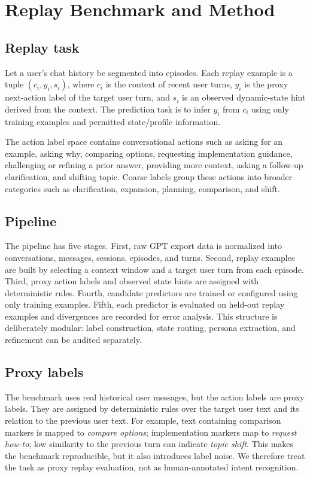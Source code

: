 \section{Replay Benchmark and Method}
\label{sec:method}

\subsection{Replay task}

Let a user's chat history be segmented into episodes. Each replay example is a tuple $(c_i, y_i, s_i)$, where $c_i$ is the context of recent user turns, $y_i$ is the proxy next-action label of the target user turn, and $s_i$ is an observed dynamic-state hint derived from the context. The prediction task is to infer $y_i$ from $c_i$ using only training examples and permitted state/profile information.

The action label space contains conversational actions such as asking for an example, asking why, comparing options, requesting implementation guidance, challenging or refining a prior answer, providing more context, asking a follow-up clarification, and shifting topic. Coarse labels group these actions into broader categories such as clarification, expansion, planning, comparison, and shift.

\subsection{Pipeline}

The pipeline has five stages. First, raw GPT export data is normalized into conversations, messages, sessions, episodes, and turns. Second, replay examples are built by selecting a context window and a target user turn from each episode. Third, proxy action labels and observed state hints are assigned with deterministic rules. Fourth, candidate predictors are trained or configured using only training examples. Fifth, each predictor is evaluated on held-out replay examples and divergences are recorded for error analysis. This structure is deliberately modular: label construction, state routing, persona extraction, and refinement can be audited separately.

\subsection{Proxy labels}

The benchmark uses real historical user messages, but the action labels are proxy labels. They are assigned by deterministic rules over the target user text and its relation to the previous user text. For example, text containing comparison markers is mapped to \emph{compare options}; implementation markers map to \emph{request how-to}; low similarity to the previous turn can indicate \emph{topic shift}. This makes the benchmark reproducible, but it also introduces label noise. We therefore treat the task as proxy replay evaluation, not as human-annotated intent recognition.

